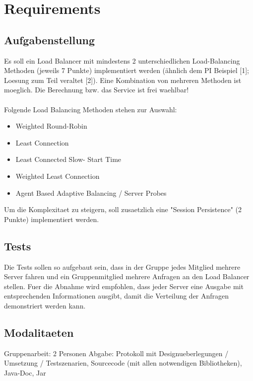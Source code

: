 \documentclass[11pt, a4paper]{article}
\begin{document}
\section{Requirements}

\subsection{Aufgabenstellung}

Es soll ein Load Balancer mit mindestens 2 unterschiedlichen
Load-Balancing Methoden (jeweils 7 Punkte) implementiert werden
(ähnlich dem PI Beispiel [1]; Loesung zum Teil veraltet [2]). Eine
Kombination von mehreren Methoden ist moeglich. Die Berechnung
bzw. das Service ist frei waehlbar!
\\\\
Folgende Load Balancing Methoden stehen zur Auswahl:

\begin{itemize}
	\item Weighted Round-Robin
	\item Least Connection
	\item Least Connected Slow- Start Time
	\item Weighted Least Connection
	\item Agent Based Adaptive Balancing / Server Probes
\end{itemize}

Um die Komplexitaet zu steigern, soll zusaetzlich eine "Session
Persistence" (2 Punkte) implementiert werden.

\subsection{Tests}

Die Tests sollen so aufgebaut sein, dass in der Gruppe jedes Mitglied
mehrere Server fahren und ein Gruppenmitglied mehrere Anfragen an den
Load Balancer stellen. Fuer die Abnahme wird empfohlen, dass jeder
Server eine Ausgabe mit entsprechenden Informationen ausgibt, damit
die Verteilung der Anfragen demonstriert werden kann.

\subsection{Modalitaeten}

Gruppenarbeit: 2 Personen Abgabe: Protokoll mit Designueberlegungen /
Umsetzung / Testszenarien, Sourcecode (mit allen notwendigen
Bibliotheken), Java-Doc, Jar
\end{document}
